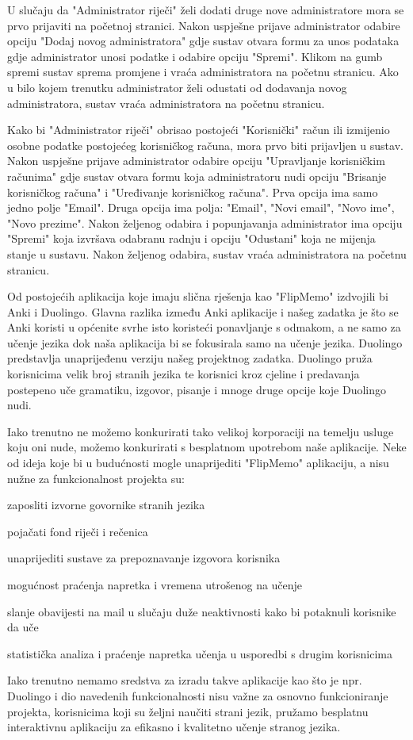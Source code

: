 U slučaju da "Administrator riječi" želi dodati druge nove administratore mora se prvo prijaviti na početnoj stranici. Nakon uspješne prijave administrator odabire opciju "Dodaj novog administratora"
gdje sustav otvara formu za unos podataka gdje administrator unosi podatke i odabire opciju "Spremi". Klikom na gumb spremi sustav sprema promjene i vraća administratora na početnu stranicu. 
Ako u bilo kojem trenutku administrator želi odustati od dodavanja novog administratora, sustav vraća administratora na početnu stranicu.

Kako bi "Administrator riječi" obrisao postojeći "Korisnički" račun ili izmijenio osobne podatke postojećeg korisničkog računa, mora prvo biti prijavljen u sustav. Nakon uspješne prijave administrator odabire opciju "Upravljanje korisničkim računima" gdje sustav otvara formu koja administratoru nudi opciju "Brisanje korisničkog računa" i "Uređivanje korisničkog računa". Prva opcija ima samo jedno polje "Email". Druga opcija ima polja: "Email", "Novi email", "Novo ime", "Novo prezime". Nakon željenog odabira i popunjavanja administrator ima opciju "Spremi" koja izvršava odabranu radnju i opciju "Odustani" koja ne mijenja stanje u sustavu. Nakon željenog odabira, sustav vraća administratora na početnu stranicu.

Od postojećih aplikacija koje imaju slična rješenja kao "FlipMemo" izdvojili bi Anki i Duolingo. Glavna razlika između Anki aplikacije i našeg zadatka je što se Anki koristi u općenite svrhe isto koristeći ponavljanje s odmakom, a ne samo za učenje jezika dok naša aplikacija bi se fokusirala samo na učenje jezika. Duolingo predstavlja unaprijeđenu verziju našeg projektnog zadatka. Duolingo pruža korisnicima velik broj stranih jezika te korisnici kroz cjeline i predavanja postepeno uče gramatiku, izgovor, pisanje i mnoge druge opcije koje Duolingo nudi. 

Iako trenutno ne možemo konkurirati tako velikoj korporaciji na temelju usluge koju oni nude, možemo konkurirati s besplatnom upotrebom naše aplikacije. Neke od ideja koje bi u budućnosti mogle unaprijediti "FlipMemo" aplikaciju, a nisu nužne za funkcionalnost projekta su:

\begin{packed_item}
	\item  zaposliti izvorne govornike stranih jezika 
	\item  pojačati fond riječi i rečenica
	\item  unaprijediti sustave za prepoznavanje izgovora korisnika
	\item  mogućnost praćenja napretka i vremena utrošenog na učenje 
	\item  slanje obavijesti na mail u slučaju duže neaktivnosti kako bi potaknuli korisnike da uče
	\item  statistička analiza i praćenje napretka učenja u usporedbi s drugim korisnicima 
\end{packed_item}

Iako trenutno nemamo sredstva za izradu takve aplikacije kao što je npr. Duolingo i dio navedenih funkcionalnosti nisu važne za osnovno funkcioniranje projekta, korisnicima koji su željni naučiti strani jezik, pružamo besplatnu interaktivnu aplikaciju za efikasno i kvalitetno učenje stranog jezika.

	